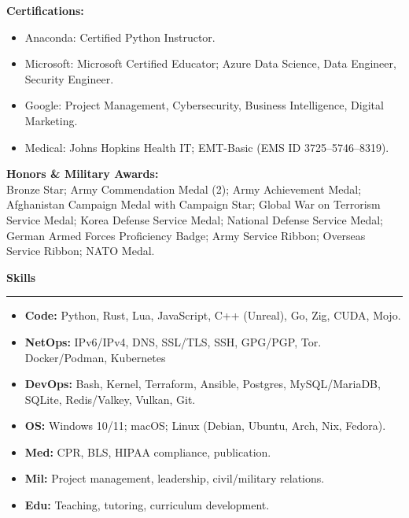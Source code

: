 \documentclass[9pt,a4paper]{article}
\newenvironment{expitemize}{%
  \begin{itemize}[leftmargin=*, topsep=0pt, itemsep=0pt, parsep=0pt, partopsep=0pt]
}{%
  \end{itemize}
}
\newcommand{\sectionline}{%
  \nointerlineskip
  \vspace{0.25em}%
  \hspace*{-\hoffset}\hspace*{-\oddsidemargin}%
  \rule{\dimexpr\textwidth+\hoffset+\oddsidemargin\relax}{0.4pt}%
  \vspace{0.4em}%
}
\newcommand{\centersection}[1]{%
  \vspace{0.6em}%
  \begin{center}
    \large\bfseries #1%
  \end{center}
  \sectionline
}
\begin{document}
\textbf{Certifications:}\\[-0.9\baselineskip]
\begin{expitemize}
  \setlength{\topsep}{0pt}
  \setlength{\parsep}{0pt}
  \setlength{\partopsep}{0pt}
  \setlength{\itemsep}{0pt}
  \item Anaconda: Certified Python Instructor.
  \item Microsoft: Microsoft Certified Educator; Azure Data Science, Data Engineer, Security Engineer.
  \item Google: Project Management, Cybersecurity, Business Intelligence, Digital Marketing.
  \item Medical: Johns Hopkins Health IT; EMT-Basic (EMS ID 3725--5746--8319).
\end{expitemize}

\vspace{0.2em}
\textbf{Honors \& Military Awards:}\\
Bronze Star; Army Commendation Medal (2); Army Achievement Medal;
Afghanistan Campaign Medal with Campaign Star;
Global War on Terrorism Service Medal;
Korea Defense Service Medal;
National Defense Service Medal;
German Armed Forces Proficiency Badge;
Army Service Ribbon;
Overseas Service Ribbon;
NATO Medal.

\vspace{0.4em}
\centersection{Skills}
\begin{itemize}[leftmargin=*]
  \item \textbf{Code:} Python, Rust, Lua, JavaScript, C++ (Unreal), Go, Zig, CUDA, Mojo.
  \item \textbf{NetOps:} IPv6/IPv4, DNS, SSL/TLS, SSH, GPG/PGP, Tor. Docker/Podman, Kubernetes
  \item \textbf{DevOps:} Bash, Kernel, Terraform, Ansible, Postgres, MySQL/MariaDB, SQLite, Redis/Valkey, Vulkan, Git.
  \item \textbf{OS:} Windows 10/11; macOS; Linux (Debian, Ubuntu, Arch, Nix, Fedora).
  \item \textbf{Med:} CPR, BLS, HIPAA compliance, publication.
  \item \textbf{Mil:} Project management, leadership, civil/military relations.
  \item \textbf{Edu:} Teaching, tutoring, curriculum development.
\end{itemize}
\end{document}

